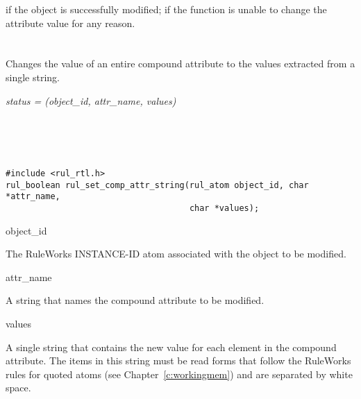 \ReturnValue

 if the object is successfully modified;  if the
function is unable to change the attribute value for any reason.

\begin{seealso}

    

\end{seealso}

\section*{}

Changes the value of an entire compound attribute to the values
extracted from a single string.

\Syntax

\it{status} = (\it{object\_id},
\it{attr\_name}, \it{values})

\begin{args}
   \\
   \\
   \\
\end{args}

\CBinding
\begin{verbatim}
#include <rul_rtl.h>
rul_boolean rul_set_comp_attr_string(rul_atom object_id, char *attr_name,
                                     char *values);
\end{verbatim}

\begin{arguments}
\item[object\_id]

  The RuleWorks INSTANCE-ID atom associated with the object to be
  modified.

\item[attr\_name]

  A string that names the compound attribute to be modified.

\item[values]

  A single string that contains the new value for each element in the
  compound attribute. The items in this string must be read forms that
  follow the RuleWorks rules for quoted atoms (see
  Chapter~\ref{c:workingmem}) and are separated by white space.
\end{arguments}

